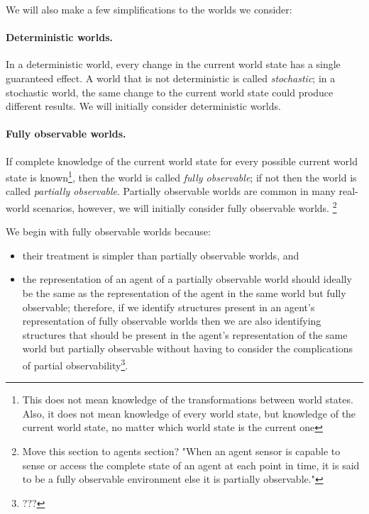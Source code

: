 We will also make a few simplifications to the worlds we consider:
\paragraph{Deterministic worlds.}
In a deterministic world, every change in the current world state has a single guaranteed effect.
A world that is not deterministic is called \emph{stochastic}; in a stochastic world, the same change to the current world state could produce different results.
We will initially consider deterministic worlds.

\paragraph{Fully observable worlds.}
If complete knowledge of the current world state for every possible current world state is known\footnote{This does not mean knowledge of the transformations between world states. Also, it does not mean knowledge of every world state, but knowledge of the current world state, no matter which world state is the current one}, then the world is called \emph{fully observable}; if not then the world is called \emph{partially observable}.
Partially observable worlds are common in many real-world scenarios, however, we will initially consider fully observable worlds.
\footnote{Move this section to agents section? "When an agent sensor is capable to sense or access the complete state of an agent at each point in time, it is said to be a fully observable environment else it is partially observable."}

We begin with fully observable worlds because:
\begin{itemize}
	\item their treatment is simpler than partially observable worlds, and
	\item the representation of an agent of a partially observable world should ideally be the same as the representation of the agent in the same world but fully observable; therefore, if we identify structures present in an agent's representation of fully observable worlds then we are also identifying structures that should be present in the agent's representation of the same world but partially observable without having to consider the complications of partial observability\footnote{???}.
\end{itemize}

